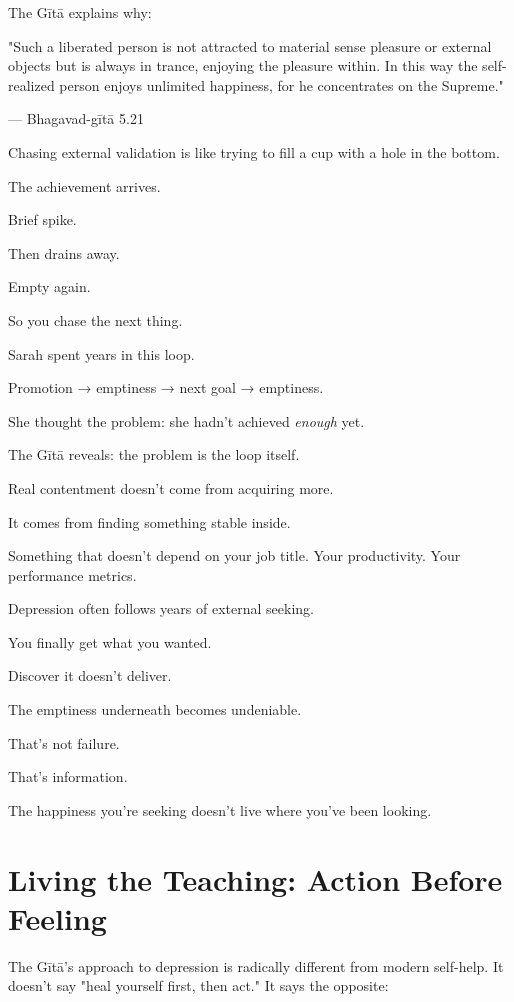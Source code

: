 \documentclass[11pt,twoside]{book}
\begin{document}
The Gītā explains why:

\begin{pullquote}
"Such a liberated person is not attracted to material sense pleasure or external objects but is always in trance, enjoying the pleasure within. In this way the self-realized person enjoys unlimited happiness, for he concentrates on the Supreme."

--- Bhagavad-gītā 5.21
\end{pullquote}

Chasing external validation is like trying to fill a cup with a hole in the bottom.

The achievement arrives.

Brief spike.

Then drains away.

Empty again.

So you chase the next thing.

Sarah spent years in this loop.

Promotion → emptiness → next goal → emptiness.

She thought the problem: she hadn't achieved \textit{enough} yet.

The Gītā reveals: the problem is the loop itself.

Real contentment doesn't come from acquiring more.

It comes from finding something stable inside.

Something that doesn't depend on your job title. Your productivity. Your performance metrics.

Depression often follows years of external seeking.

You finally get what you wanted.

Discover it doesn't deliver.

The emptiness underneath becomes undeniable.

That's not failure.

That's information.

The happiness you're seeking doesn't live where you've been looking.

\section*{Living the Teaching: Action Before Feeling}

The Gītā's approach to depression is radically different from modern self-help. It doesn't say "heal yourself first, then act." It says the opposite:
\end{document}
